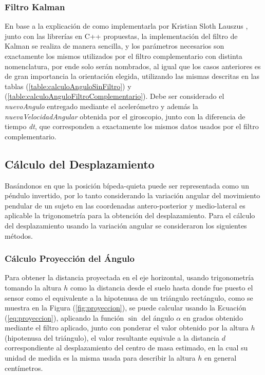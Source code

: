 \documentclass[12pt,a4paper]{article}
\begin{document}
\subsubsection{Filtro Kalman}
En base a la explicación de como implementarla por Kristian Sloth Lauszus
\cite{kalmanTKJ}, junto con las librerías en C++ propuestas, la implementación del filtro de Kalman se realiza de manera sencilla, y los parámetros necesarios son exactamente los mismos utilizados por el filtro complementario con distinta nomenclatura, por ende solo serán nombrados, al igual que los casos anteriores es de gran importancia la orientación elegida, utilizando las mismas descritas en las tablas (\ref{table:calculoAnguloSinFiltro}) y (\ref{table:calculoAnguloFiltroComplementario}).
Debe ser considerado el \textit{nuevoAngulo} entregado mediante el acelerómetro y además la \textit{nuevaVelocidadAngular} obtenida por el giroscopio, junto con la diferencia de tiempo \textit{dt}, que corresponden a exactamente los mismos datos usados por el filtro complementario. 



\subsection{Cálculo del Desplazamiento}
Basándonos en que la posición bípeda-quieta puede ser representada como un péndulo invertido, por lo tanto considerando la variación angular del movimiento pendular de un sujeto en las coordenadas antero-posterior y medio-lateral es aplicable la trigonometría para la obtención del desplazamiento.
Para el cálculo del desplazamiento usando la variación angular se consideraron los siguientes métodos. 

\subsubsection{Cálculo Proyección del Ángulo}
Para obtener la distancia proyectada en el eje horizontal, usando trigonometría tomando la altura $h$ como la distancia desde el suelo hasta donde fue puesto el sensor como el equivalente a la hipotenusa de un triángulo rectángulo, como se muestra en la Figura (\ref{fig:proyeccion}), se puede calcular usando la Ecuación (\ref{eq:proyeccion}), aplicando la función $\sin$ del ángulo $\alpha$ en grados obtenido mediante el filtro aplicado, junto con ponderar el valor obtenido por la altura $h$ (hipotenusa del triángulo), el valor resultante equivale a la distancia $d$ correspondiente al desplazamiento del centro de masa estimado, en la cual su unidad de medida es la misma usada para describir la altura $h$ en general centímetros.
\end{document}
